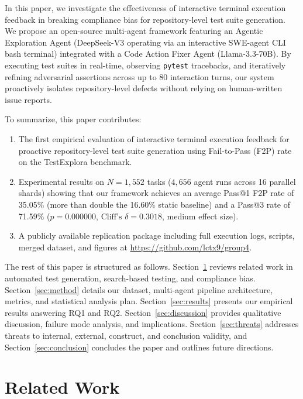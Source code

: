 \documentclass[conference]{IEEEtran}
\begin{document}
In this paper, we investigate the effectiveness of interactive terminal execution feedback in breaking compliance bias for repository-level test suite generation. We propose an open-source multi-agent framework featuring an Agentic Exploration Agent (DeepSeek-V3 operating via an interactive SWE-agent CLI bash terminal) integrated with a Code Action Fixer Agent (Llama-3.3-70B). By executing test suites in real-time, observing \texttt{pytest} tracebacks, and iteratively refining adversarial assertions across up to 80 interaction turns, our system proactively isolates repository-level defects without relying on human-written issue reports.

To summarize, this paper contributes:
\begin{enumerate}
    \item The first empirical evaluation of interactive terminal execution feedback for proactive repository-level test suite generation using Fail-to-Pass (F2P) rate on the TestExplora benchmark.
    \item Experimental results on $N=1,552$ tasks ($4,656$ agent runs across 16 parallel shards) showing that our framework achieves an average Pass@1 F2P rate of 35.05\% (more than double the 16.60\% static baseline) and a Pass@3 rate of 71.59\% ($p = 0.000000$, $\text{Cliff's } \delta = 0.3018$, medium effect size).
    \item A publicly available replication package including full execution logs, scripts, merged dataset, and figures at \url{https://github.com/lctx9/group4}.
\end{enumerate}

The rest of this paper is structured as follows. Section~\ref{sec:related} reviews related work in automated test generation, search-based testing, and compliance bias. Section~\ref{sec:method} details our dataset, multi-agent pipeline architecture, metrics, and statistical analysis plan. Section~\ref{sec:results} presents our empirical results answering RQ1 and RQ2. Section~\ref{sec:discussion} provides qualitative discussion, failure mode analysis, and implications. Section~\ref{sec:threats} addresses threats to internal, external, construct, and conclusion validity, and Section~\ref{sec:conclusion} concludes the paper and outlines future directions.

\section{Related Work}
\label{sec:related}
\end{document}
